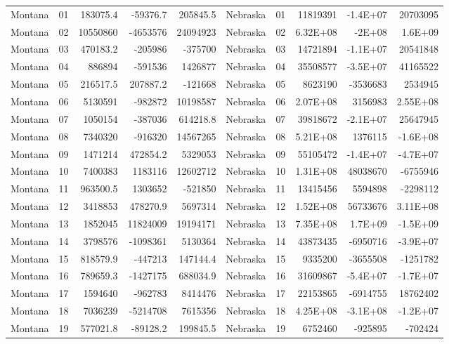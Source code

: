 \begin{landscape}
\begin{singlespace}
\begin{longtable}{lrrrr|lrrrr}
		Montana &  01  & 183075.4 & -59376.7 & 205845.5 & Nebraska &  01  & 11819391 & -1.4E+07 & 20703095 \\
		Montana &  02  & 10550860 & -4653576 & 24094923 & Nebraska &  02  & 6.32E+08 & -2E+08 & 1.6E+09 \\
		Montana &  03  & 470183.2 & -205986 & -375700 & Nebraska &  03  & 14721894 & -1.1E+07 & 20541848 \\
		Montana &  04  & 886894 & -591536 & 1426877 & Nebraska &  04  & 35508577 & -3.5E+07 & 41165522 \\
		Montana &  05  & 216517.5 & 207887.2 & -121668 & Nebraska &  05  & 8623190 & -3536683 & 2534945 \\
		Montana &  06  & 5130591 & -982872 & 10198587 & Nebraska &  06  & 2.07E+08 & 3156983 & 2.55E+08 \\
		Montana &  07  & 1050154 & -387036 & 614218.8 & Nebraska &  07  & 39818672 & -2.1E+07 & 25647945 \\
		Montana &  08  & 7340320 & -916320 & 14567265 & Nebraska &  08  & 5.21E+08 & 1376115 & -1.6E+08 \\
		Montana &  09  & 1471214 & 472854.2 & 5329053 & Nebraska &  09  & 55105472 & -1.4E+07 & -4.7E+07 \\
		Montana &  10 & 7400383 & 1183116 & 12602712 & Nebraska &  10 & 1.31E+08 & 48038670 & -6755946 \\
		Montana &  11 & 963500.5 & 1303652 & -521850 & Nebraska &  11 & 13415456 & 5594898 & -2298112 \\
		Montana &  12 & 3418853 & 478270.9 & 5697314 & Nebraska &  12 & 1.52E+08 & 56733676 & 3.11E+08 \\
		Montana &  13 & 1852045 & 11824009 & 19194171 & Nebraska &  13 & 7.35E+08 & 1.7E+09 & -1.5E+09 \\
		Montana &  14 & 3798576 & -1098361 & 5130364 & Nebraska &  14 & 43873435 & -6950716 & -3.9E+07 \\
		Montana &  15 & 818579.9 & -447213 & 147144.4 & Nebraska &  15 & 9335200 & -3655508 & -1251782 \\
		Montana &  16 & 789659.3 & -1427175 & 688034.9 & Nebraska &  16 & 31609867 & -5.4E+07 & -1.7E+07 \\
		Montana &  17 & 1594640 & -962783 & 8414476 & Nebraska &  17 & 22153865 & -6914755 & 18762402 \\
		Montana &  18 & 7036239 & -5214708 & 7615356 & Nebraska &  18 & 4.25E+08 & -3.1E+08 & -1.2E+07 \\
		Montana &  19 & 577021.8 & -89128.2 & 199845.5 & Nebraska &  19 & 6752460 & -925895 & -702424 \\

\end{longtable}
\end{singlespace}
\end{landscape}
